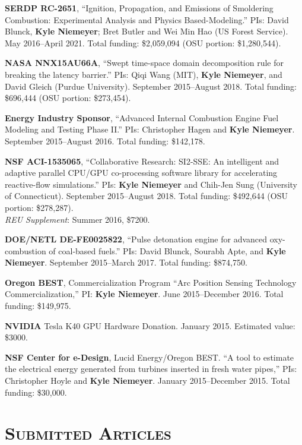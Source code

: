 \documentclass[margin,line,11pt]{res}
\begin{document}
\begin{resume}
\textbf{SERDP RC-2651}, ``Ignition, Propagation, and Emissions of Smoldering Combustion: Experimental Analysis and Physics Based-Modeling.'' PIs: David Blunck, \textbf{Kyle Niemeyer}; Bret Butler and Wei Min Hao (US Forest Service). May 2016--April 2021. Total funding: \$2,059,094 (OSU portion: \$1,280,544).

\textbf{NASA NNX15AU66A}, ``Swept time-space domain decomposition rule for breaking the latency barrier.'' PIs: Qiqi Wang (MIT), \textbf{Kyle Niemeyer}, and David Gleich (Purdue University). September 2015--August 2018. Total funding: \$696,444 (OSU portion: \$273,454).

\textbf{Energy Industry Sponsor}, ``Advanced Internal Combustion Engine Fuel Modeling and Testing Phase II.'' PIs: Christopher Hagen and \textbf{Kyle Niemeyer}. September 2015--August 2016. Total funding: \$142,178.

\textbf{NSF ACI-1535065}, ``Collaborative Research: SI2-SSE: An intelligent and adaptive parallel CPU\slash GPU co-processing software library for accelerating reactive-flow simulations.'' PIs: \textbf{Kyle Niemeyer} and Chih-Jen Sung (University of Connecticut). September 2015--August 2018. Total funding: \$492,644 (OSU portion: \$278,287). \\
\textit{REU Supplement}: Summer 2016, \$7200.

\textbf{DOE\slash NETL DE-FE0025822}, ``Pulse detonation engine for advanced oxy-combustion of coal-based fuels.'' PIs: David Blunck, Sourabh Apte, and \textbf{Kyle Niemeyer}. September 2015--March 2017. Total funding: \$874,750.

\textbf{Oregon BEST}, Commercialization Program ``Arc Position Sensing Technology Commercialization,'' PI: \textbf{Kyle Niemeyer}. June 2015--December 2016. Total funding: \$149,975.

\textbf{NVIDIA} Tesla K40 GPU Hardware Donation. January 2015. Estimated value: \$3000.

\textbf{NSF Center for e-Design}, Lucid Energy\slash Oregon BEST. ``A tool to estimate the electrical energy generated from turbines inserted in fresh water pipes,'' PIs: Christopher Hoyle and \textbf{Kyle Niemeyer}. January 2015--December 2015. Total funding: \$30,000.

\section{\textsc{Submitted Articles}}


\end{resume}
\end{document}
